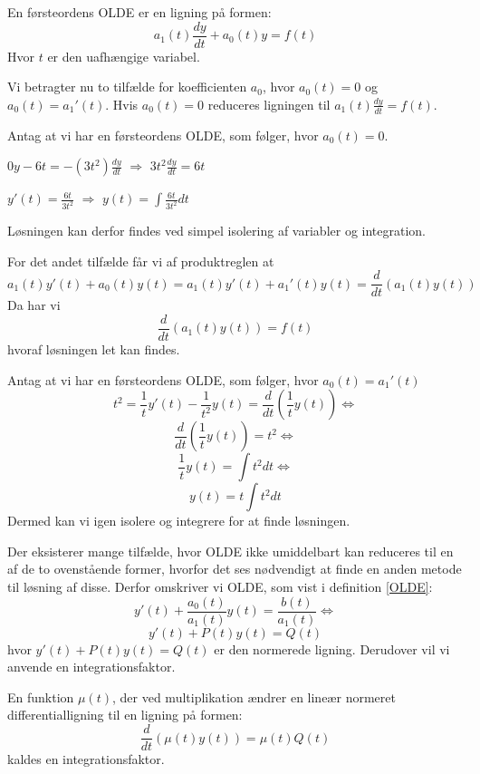 En førsteordens OLDE er en ligning på formen: \\ 
$$a_{1}(t) \frac{dy}{dt} + a_{0}(t)y = f(t)$$ Hvor $t$ er den uafhængige variabel. \hfill \break

Vi betragter nu to tilfælde for koefficienten $a_0$, hvor $a_0(t) = 0$ og $a_0(t) = a_1'(t)$. Hvis $a_0(t) = 0$ reduceres ligningen til $a_1(t)\frac{dy}{dt} = f(t)$.  
\begin{Example}\hfill \break
\textnormal{Antag at vi har en førsteordens OLDE, som følger, hvor $a_0(t) = 0$.}\\
\hfill \break
\centerline{$0y - 6t = -(3t^2) \frac{dy}{dt}$ $\Rightarrow$ $3t^2 \frac{dy}{dt} = 6t$}
\hfill \break
\centerline{$y'(t) = \frac{6t}{3t^2}$ $\Rightarrow$ $y(t) = \int \frac{6t}{3t^2}dt$}
\hfill \break
\textnormal{Løsningen kan derfor findes ved simpel isolering af variabler og integration.}
\end{Example}

For det andet tilfælde får vi af produktreglen at $$a_1(t)y'(t) + a_0(t)y(t) = a_1(t)y'(t) + a_1'(t)y(t) = \frac{d}{dt}(a_1(t)y(t))$$Da har vi $$\frac{d}{dt}(a_1(t)y(t)) = f(t)$$ hvoraf løsningen let kan findes.

\begin{Example} \hfill \break
\textnormal{Antag at vi har en førsteordens OLDE, som følger, hvor $a_0(t) = a_1'(t)$} \\
\hfill \break
$$t^2 = \frac{1}{t}y'(t) -\frac{1}{t^2}y(t) = \frac{d}{dt}(\frac{1}{t}y(t))\Leftrightarrow$$
$$\frac{d}{dt}(\frac{1}{t}y(t)) = t^2\Leftrightarrow$$
$$\frac{1}{t}y(t) = \int t^2dt \Leftrightarrow$$ $$ y(t) = t \int t^2dt$$
\hfill \break
\textnormal{Dermed kan vi igen isolere og integrere for at finde løsningen.}
\end{Example}

Der eksisterer mange tilfælde, hvor OLDE ikke umiddelbart kan reduceres til en af de to ovenstående former, hvorfor det ses nødvendigt at finde en anden metode til løsning af disse. Derfor omskriver vi OLDE, som vist i definition \ref{OLDE}: $${y'(t) + \frac{a_0(t)}{a_1(t)}y(t) = \frac{b(t)}{a_1(t)}} \Leftrightarrow$$
$$y'(t) + P(t)y(t) = Q(t)$$ hvor $y'(t) + P(t)y(t) = Q(t)$ er den normerede ligning. Derudover vil vi anvende en integrationsfaktor.

\begin{definition}[Integrationsfaktor]\label{IntFak}
En funktion $\mu (t)$, der ved multiplikation ændrer en lineær normeret differentialligning til en ligning på formen: $$\frac{d}{dt}(\mu (t)y(t)) = \mu (t)Q(t)$$ kaldes en integrationsfaktor.  
\end{definition}

